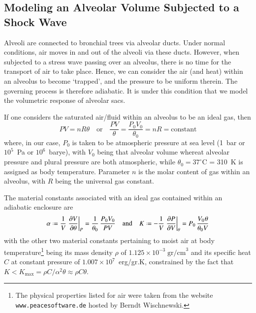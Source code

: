 \subsection{Modeling an Alveolar Volume Subjected to a Shock Wave}
\label{sec:IdealGasLaw}

Alveoli are connected to bronchial trees via alveolar ducts.  Under normal conditions, air moves in and out of the alveoli via these ducts.  However, when subjected to a stress wave passing over an alveolus, there is no time for the transport of air to take place.  Hence, we can consider the air (and heat) within an alveolus to become `trapped', and the pressure to be uniform therein.  The governing process is therefore adiabatic.  It is under this condition that we model the volumetric response of alveolar sacs.

If one considers the saturated air\slash fluid within an alveolus to be an ideal gas, then \cite{Davison08}
\begin{equation}
P V = n \! R \theta
\quad \text{or} \quad
\frac{P V}{\theta} = \frac{P_0 V_0}{\theta_0} = n \! R = \mathrm{constant}
\label{idealGas}
\end{equation}
where, in our case, $P_0$ is taken to be atmospheric pressure at sea level (1~bar or $10^5$~Pa or $10^6$~barye), with $V_0$ being that alveolar volume whereat alveolar pressure and plural pressure are both atmospheric, while $\theta_0 = 37^{\circ}$C = 310~K is assigned as body temperature.  Parameter $n$ is the molar content of gas within an alveolus, with $R$  being the universal gas constant.  

The material constants associated with an ideal gas contained within an adiabatic enclosure are
\begin{equation}
\alpha \defeq \frac{1}{V} \left. \frac{\partial V}{\partial \theta} \right|_P = 
\frac{1}{\theta_0} \, \frac{P_0 V_0}{P V}
\quad \text{and} \quad
K \defeq -\frac{1}{V} \left. \frac{\partial P}{\partial V} \right|_{\theta} = 
P_0 \, \frac{V_0 \hspace{0.5pt} \theta}{\theta_0 V}
\label{idealGasConstants}
\end{equation}
with the other two material constants pertaining to moist air at body temperature\footnote{
    The physical properties listed for air were taken from the website \texttt{www.peacesoftware.de} hosted by Berndt Wischnewski.
}
being its mass density $\rho$ of $1.125 \times 10^{-3} \; \text{gr/cm}^3$ and its specific heat $C$ at constant pressure of $1.007 \times 10^7$~erg/gr.K, constrained by the fact that $K < K_{\max} = \rho C / \alpha^2 \theta \approx \rho C \theta$.

